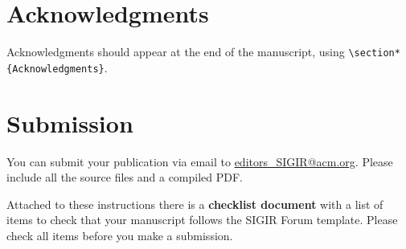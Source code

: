 \documentclass[news]{sigirforum}
\begin{document}
\section{Acknowledgments}

Acknowledgments should appear at the end of the manuscript, using \texttt{\textbackslash section*\{Acknowledgments\}}.

\section{Submission}

You can submit your publication via email to \url{editors\_SIGIR@acm.org}. Please include all the source files and a compiled PDF.

Attached to these instructions there is a \textbf{checklist document} with a list of items to check that your manuscript follows the SIGIR Forum template. Please check all items before you make a submission.


\end{document}
